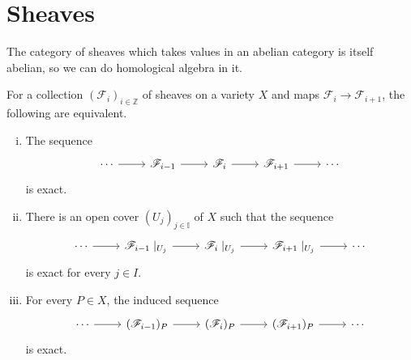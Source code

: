 \documentclass[12pt]{article}
\begin{document}
\section{Sheaves}
The category of sheaves which takes values in an abelian category is
itself abelian, so we can do homological algebra in it.

\begin{thm}\label{thm:ses_equivalence}
  For a collection $(\mathscr{F}_{i})_{i\in\mathbb{Z}}$ of sheaves on
  a variety $X$ and maps ${\mathscr{F}_{i}\to\mathscr{F}_{i+1}}$,
  the following are equivalent.
  \begin{enumerate}[(i)]
    \item The sequence
          \[
          \begin{tikzcd}
            \cdots \arrow{r} & \mathscr{F}_{i-1}\arrow{r}
            & \mathscr{F}_{i}\arrow{r} & \mathscr{F}_{i+1}\arrow{r} & \cdots
          \end{tikzcd}
          \]
          is exact.
    \item There is an open cover $(U_{j})_{j\in\mathbb{I}}$ of $X$ such that
          the sequence
          \[
          \begin{tikzcd}
            \cdots \arrow{r} & \mathscr{F}_{i-1}\mid_{U_{j}}\arrow{r}
            & \mathscr{F}_{i}\mid_{U_{j}}\arrow{r}
            & \mathscr{F}_{i+1}\mid_{U_{j}}\arrow{r} & \cdots
          \end{tikzcd}
          \]
          is exact for every $j\in I$.
    \item For every $P\in X$, the induced sequence
          \[
          \begin{tikzcd}
            \cdots \arrow{r} & (\mathscr{F}_{i-1})_{P}\arrow{r}
            & (\mathscr{F}_{i})_{P}\arrow{r}
            & (\mathscr{F}_{i+1})_{P}\arrow{r} & \cdots
          \end{tikzcd}
          \]
          is exact.
  \end{enumerate}
\end{thm}
\end{document}
